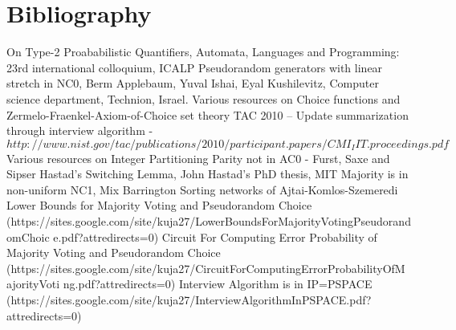 \documentclass[11pt,onecolumn]{article}
\begin{document}
\section{Bibliography}
\begin{thebibliography}{99}
 On Type-2 Proababilistic Quantifiers, Automata, Languages and Programming: 23rd international colloquium, ICALP
 Pseudorandom generators with linear stretch in NC0, Berm Applebaum, Yuval Ishai, Eyal Kushilevitz, Computer science department, Technion, Israel.
 Various resources on Choice functions and Zermelo-Fraenkel-Axiom-of-Choice set theory
 TAC 2010 – Update summarization through interview algorithm -
$http://www.nist.gov/tac/publications/2010/participant.papers/CMI_IIT.proceedings.pdf
$
 Various resources on Integer Partitioning
 Parity not in AC0 - Furst, Saxe and Sipser
 Hastad's Switching Lemma, John Hastad's PhD thesis, MIT
 Majority is in non-uniform NC1, Mix Barrington
 Sorting networks of Ajtai-Komlos-Szemeredi
 Lower Bounds for Majority Voting and Pseudorandom Choice 
(https://sites.google.com/site/kuja27/LowerBoundsForMajorityVotingPseudorandomChoic
e.pdf?attredirects=0)
 Circuit For Computing Error Probability of Majority Voting and Pseudorandom Choice (https://sites.google.com/site/kuja27/CircuitForComputingErrorProbabilityOfMajorityVoti
ng.pdf?attredirects=0)
 Interview Algorithm is in IP=PSPACE 
(https://sites.google.com/site/kuja27/InterviewAlgorithmInPSPACE.pdf?attredirects=0)
\end{thebibliography}
\end{document}
